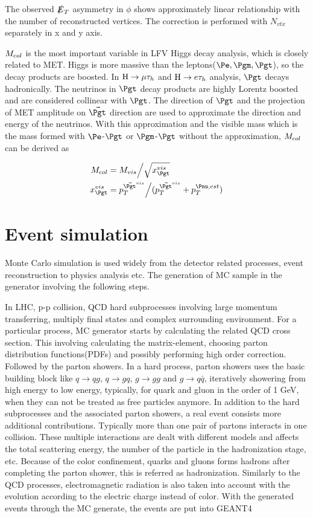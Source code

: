 The observed $\slashed{E}_{T}$ asymmetry in $\phi$ shows approximately linear relationship with the number of reconstructed vertices. The correction is performed with $N_{vtx}$ separately in x and y axis. 

$M_{col}$ is the most important variable in LFV Higgs decay analysis, which is closely related to MET. Higgs is more massive than the leptons($\Pe,\Pgm,\Pgt$), so the decay products are boosted. In $\mathrm{H}\to \mu\tau_{h}$ and $\mathrm{H} \to e \tau_{h}$ analysis, $\Pgt$ decays hadronically. The neutrinos in $\Pgt$ decay products are highly Lorentz boosted and are considered collinear with $\Pgt$. The direction of $\Pgt$ and the projection of MET amplitude on $\vec{\Pgt}$ direction are used to approximate the direction and energy of the neutrinos. With this approximation and the visible mass which is the mass formed with $\Pe$-$\Pgt$ or $\Pgm$-$\Pgt$ without the approximation, $M_{col}$ can be derived as

\begin{align*}
\mcol&=M_{vis}\Big/\sqrt{x^{vis}_{\Pgt}}\\
x^{vis}_{\Pgt}&=p_{T}^{\vec{\Pgt}^{vis}}\Big/(p_{T}^{\vec{\Pgt}^{vis}}+p_{T}^{\Pnu,est})
\end{align*}

\section{Event simulation}
Monte Carlo simulation is used widely from the detector related processes, event reconstruction to physics analysis etc. The generation of MC sample in the generator involving the following steps. 

In LHC, p-p collision, QCD hard subprocesses involving large momentum transferring, multiply final states and complex surrounding environment. For a particular process, MC generator starts by calculating the related QCD cross section. This involving calculating the matrix-element, choosing parton distribution functions(PDFs) and possibly performing high order correction.  Followed by the parton showers. In a hard process, parton showers uses the basic building block like $q\rightarrow qg$, $q\rightarrow gq$, $g\rightarrow gg$ and $g\rightarrow q\bar{q}$, iteratively showering from high energy to low energy, typically, for quark and gluon in the order of 1 GeV, when they can not be treated as free particles anymore. In addition to the hard subprocesses and the associated parton showers, a real event consists more additional contributions. Typically more than one pair of partons interacts in one collision. These multiple interactions are dealt with different models and affects the total scattering energy, the number of the particle in the hadronization stage, etc. Because of the color confinement, quarks and gluons forms hadrons after completing the parton shower, this is referred as hadronization. Similarly to the QCD processes, electromagnetic radiation is also taken into account with the evolution according to the electric charge instead of color. With the generated events through the MC generate, the events are put into GEANT4~\cite{GEANT4}


